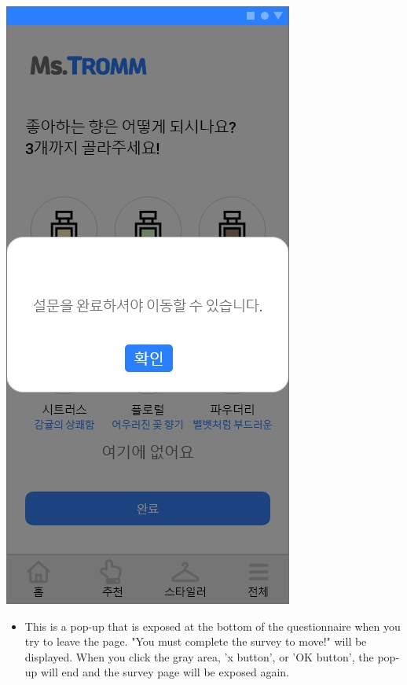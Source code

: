 \documentclass[conference]{IEEEtran}
\begin{document}
\begin{enumerate}
\begin{enumerate}
            \centerline{\includegraphics[scale=0.32]{설문지6.jpg}}
    \begin{itemize}
        \item[]  This is a pop-up that is exposed at the bottom of the questionnaire when you try to leave the page. "You must complete the survey to move!" will be displayed. When you click the gray area, 'x button', or 'OK button', the pop-up will end and the survey page will be exposed again.\\ \\ 
        \end{itemize} 


\end{enumerate}
\end{enumerate}
\end{document}
